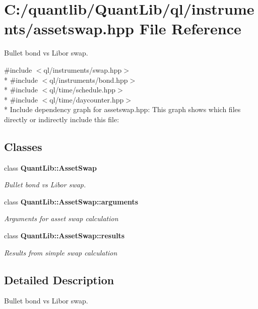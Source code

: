 \section{C\+:/quantlib/\+Quant\+Lib/ql/instruments/assetswap.hpp File Reference}
\label{assetswap_8hpp}


Bullet bond vs Libor swap.  


{\ttfamily \#include $<$ql/instruments/swap.\+hpp$>$}\\*
{\ttfamily \#include $<$ql/instruments/bond.\+hpp$>$}\\*
{\ttfamily \#include $<$ql/time/schedule.\+hpp$>$}\\*
{\ttfamily \#include $<$ql/time/daycounter.\+hpp$>$}\\*
Include dependency graph for assetswap.\+hpp\+:
This graph shows which files directly or indirectly include this file\+:
\subsection*{Classes}
\begin{DoxyCompactItemize}
\item 
class {\bf Quant\+Lib\+::\+Asset\+Swap}
\begin{DoxyCompactList}\small\item\em Bullet bond vs Libor swap. \end{DoxyCompactList}\item 
class {\bf Quant\+Lib\+::\+Asset\+Swap\+::arguments}
\begin{DoxyCompactList}\small\item\em Arguments for asset swap calculation \end{DoxyCompactList}\item 
class {\bf Quant\+Lib\+::\+Asset\+Swap\+::results}
\begin{DoxyCompactList}\small\item\em Results from simple swap calculation \end{DoxyCompactList}\end{DoxyCompactItemize}


\subsection{Detailed Description}
Bullet bond vs Libor swap. 

